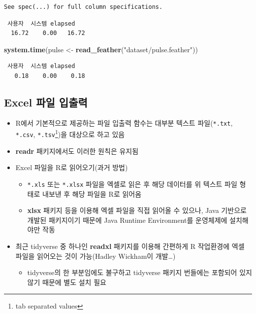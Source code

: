\documentclass[
  11pt,
]{krantz}
\newenvironment{Shaded}{\begin{snugshade}}{\end{snugshade}}
\newcommand{\KeywordTok}[1]{\textcolor[rgb]{0.27,0.27,0.27}{\textbf{#1}}}
\newcommand{\NormalTok}[1]{#1}
\newcommand{\StringTok}[1]{\textcolor[rgb]{0.5,0.5,0.5}{#1}}
\providecommand{\tightlist}{%
  \setlength{\itemsep}{0pt}\setlength{\parskip}{0pt}}
\begin{document}
\begin{verbatim}
See spec(...) for full column specifications.
\end{verbatim}

\begin{verbatim}
 사용자  시스템 elapsed 
  16.72    0.00   16.72 
\end{verbatim}

\begin{Shaded}
\begin{Highlighting}[]
\KeywordTok{system.time}\NormalTok{(pulse <-}\StringTok{ }\KeywordTok{read_feather}\NormalTok{(}\StringTok{"dataset/pulse.feather"}\NormalTok{))}
\end{Highlighting}
\end{Shaded}

\begin{verbatim}
 사용자  시스템 elapsed 
   0.18    0.00    0.18 
\end{verbatim}

\normalsize

\hypertarget{import-export-excel}{%
\subsection{Excel 파일 입출력}\label{import-export-excel}}

\begin{itemize}
\tightlist
\item
  R에서 기본적으로 제공하는 파일 입출력 함수는 대부분 텍스트 파일(\texttt{*.txt}, \texttt{*.csv}, \texttt{*.tsv}\footnote{tab separated values})을 대상으로 하고 있음
\item
  \textbf{readr} 패키지에서도 이러한 원칙은 유지됨
\item
  Excel 파일을 R로 읽어오기(과거 방법)

  \begin{itemize}
  \tightlist
  \item
    \texttt{*.xls} 또는 \texttt{*.xlsx} 파일을 엑셀로 읽은 후 해당 데이터를 위 텍스트 파일 형태로 내보낸 후 해당 파일을 R로 읽어옴
  \item
    \textbf{xlsx} 패키지 등을 이용해 엑셀 파일을 직접 읽어올 수 있으나, Java 기반으로 개발된 패키지이기 때문에 Java Runtime Environment를 운영체제에 설치해야만 작동
  \end{itemize}
\item
  최근 tidyverse 중 하나인 \textbf{readxl} 패키지를 이용해 간편하게 R 작업환경에 엑셀 파일을 읽어오는 것이 가능(Hadley Wickham이 개발\ldots)

  \begin{itemize}
  \tightlist
  \item
    tidyverse의 한 부분임에도 불구하고 tidyverse 패키지 번들에는 포함되어 있지 않기 때문에 별도 설치 필요
  \end{itemize}
\end{itemize}
\end{document}
